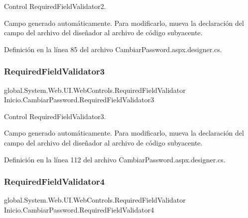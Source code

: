 Control Required\+Field\+Validator2. 

Campo generado automáticamente. Para modificarlo, mueva la declaración del campo del archivo del diseñador al archivo de código subyacente. 

Definición en la línea 85 del archivo Cambiar\+Password.\+aspx.\+designer.\+cs.

\mbox{\label{classInicio_1_1CambiarPassword_a618ca28dc9312f747d6f48cc9b11f132}} 
\subsubsection{\texorpdfstring{RequiredFieldValidator3}{RequiredFieldValidator3}}
{\footnotesize\ttfamily global.\+System.\+Web.\+U\+I.\+Web\+Controls.\+Required\+Field\+Validator Inicio.\+Cambiar\+Password.\+Required\+Field\+Validator3\hspace{0.3cm}{\ttfamily [protected]}}



Control Required\+Field\+Validator3. 

Campo generado automáticamente. Para modificarlo, mueva la declaración del campo del archivo del diseñador al archivo de código subyacente. 

Definición en la línea 112 del archivo Cambiar\+Password.\+aspx.\+designer.\+cs.

\mbox{\label{classInicio_1_1CambiarPassword_a721210b960d80ff7c87c392dc8f4d78a}} 
\subsubsection{\texorpdfstring{RequiredFieldValidator4}{RequiredFieldValidator4}}
{\footnotesize\ttfamily global.\+System.\+Web.\+U\+I.\+Web\+Controls.\+Required\+Field\+Validator Inicio.\+Cambiar\+Password.\+Required\+Field\+Validator4\hspace{0.3cm}{\ttfamily [protected]}}



